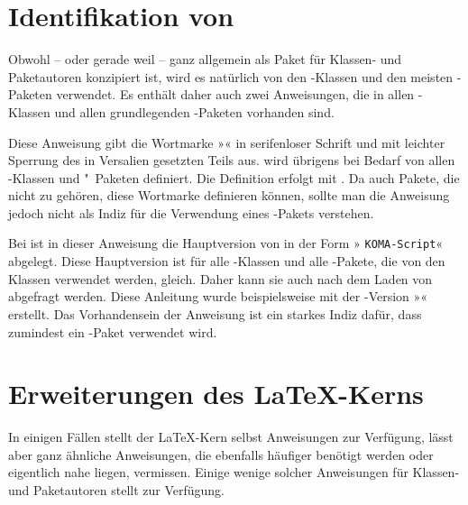 \section{Identifikation von \KOMAScript}

Obwohl -- oder gerade weil --  ganz allgemein als Paket für
Klassen- und Paketautoren konzipiert ist, wird es natürlich von den
\KOMAScript-Klassen und den meisten \KOMAScript-Paketen verwendet. Es enthält
daher auch zwei Anweisungen, die in allen \KOMAScript-Klassen und allen
grundlegenden \KOMAScript-Paketen vorhanden sind.


\begin{Declaration}
\end{Declaration}
Diese Anweisung gibt die Wortmarke »\KOMAScript« in serifenloser
Schrift und mit leichter Sperrung des in Versalien gesetzten
Teils aus.  wird übrigens bei Bedarf von allen
\KOMAScript-Klassen und "~Paketen definiert. Die Definition erfolgt mit
. Da auch Pakete, die nicht zu \KOMAScript{}
gehören, diese Wortmarke definieren können, sollte man die Anweisung jedoch
nicht als Indiz für die Verwendung eines \KOMAScript-Pakets verstehen.%
\EndIndexGroup


\begin{Declaration}
\end{Declaration}
Bei \KOMAScript{} ist in dieser Anweisung die Hauptversion von \KOMAScript{}
in der Form »  \texttt{KOMA-Script}«
abgelegt. Diese Hauptversion ist für alle \KOMAScript-Klassen und alle
\KOMAScript-Pakete, die von den Klassen verwendet werden, gleich. Daher kann
sie auch nach dem Laden von  abgefragt werden. Diese
Anleitung wurde beispielsweise mit der \KOMAScript-Version
»\KOMAScriptVersion« erstellt. Das Vorhandensein der Anweisung ist ein
starkes Indiz dafür, dass zumindest ein \KOMAScript-Paket verwendet wird.%
\EndIndexGroup


\section{Erweiterungen des \LaTeX-Kerns}

In einigen Fällen stellt der \LaTeX-Kern selbst Anweisungen zur Verfügung,
lässt aber ganz ähnliche Anweisungen, die ebenfalls häufiger benötigt werden
oder eigentlich nahe liegen, vermissen. Einige wenige solcher Anweisungen
für Klassen- und Paketautoren stellt  zur Verfügung.

